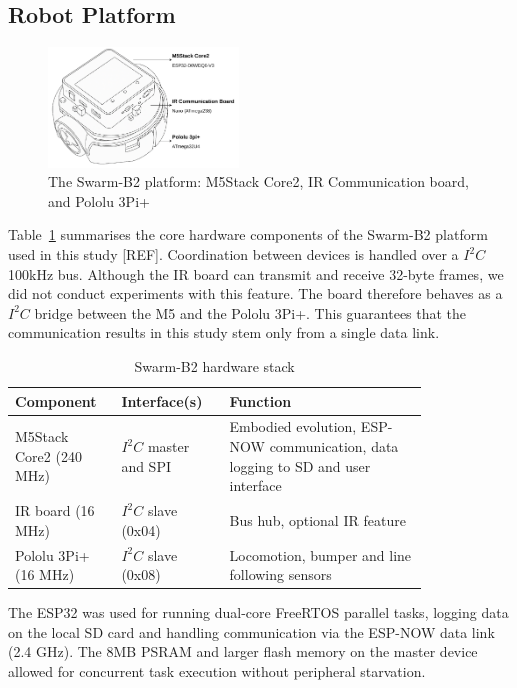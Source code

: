 \documentclass[conference]{IEEEtran}
\begin{document}
\subsection{Robot Platform}\label{sec:robot_platform}
\begin{figure}[h]
    \centering
    \includegraphics[width=0.45\textwidth]{B2.pdf}
    \caption{The Swarm-B2 platform: M5Stack Core2, IR Communication board, and Pololu 3Pi+}
    \label{fig:B2}
\end{figure}

Table~\ref{tab:B2-hardware} summarises the core hardware components of the Swarm-B2 platform used in this study [REF]. Coordination between devices is handled over a $I^2C$ 100kHz bus. Although the IR board can transmit and receive 32-byte frames, we did not conduct experiments with this feature. The board therefore behaves as a $I^2C$ bridge between the M5 and the Pololu 3Pi+. This guarantees that the communication results in this study stem only from a single data link.\\

\begin{table}[h]
  \centering
  \caption{Swarm-B2 hardware stack}
  \label{tab:B2-hardware}
  \begin{tabular}{p{0.18\linewidth} p{0.22\linewidth} p{0.42\linewidth}}
    \toprule
    Component & Interface(s) & Function \\
    \midrule
    M5Stack Core2 (240 MHz) & $I^2C$ master and SPI & Embodied evolution, ESP-NOW communication, data logging to SD and user interface \\
    IR board (16 MHz) & $I^2C$ slave (0x04) & Bus hub, optional IR feature \\
    Pololu 3Pi+ (16 MHz) & $I^2C$ slave (0x08) & Locomotion, bumper and line following sensors \\

    \bottomrule
  \end{tabular}
\end{table}

The ESP32 was used for running dual-core FreeRTOS parallel tasks, logging data on the local SD card and handling communication via the ESP-NOW data link (2.4 GHz). The 8MB PSRAM and larger flash memory on the master device allowed for concurrent task execution without peripheral starvation.\\
\end{document}

